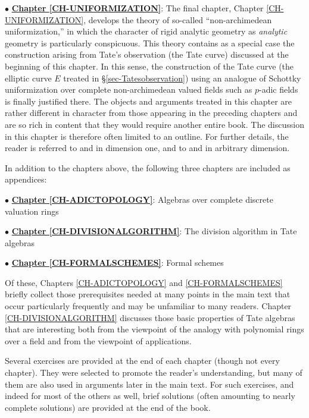 \documentclass[a4paper,12pt, dvipdfmx]{jsbook}
\theoremstyle{plain}
\theoremstyle{definition}
\begin{document}
\medskip
$\bullet$ \underline{{\bf Chapter \ref{CH-UNIFORMIZATION}}}: The final chapter, Chapter \ref{CH-UNIFORMIZATION}, develops the theory of so-called ``non-archimedean uniformization,'' in which the character of rigid analytic geometry as {\it analytic} geometry is particularly conspicuous.
This theory contains as a special case the construction arising from Tate's observation (the Tate curve) discussed at the beginning of this chapter.
In this sense, the construction of the Tate curve (the elliptic curve $E$ treated in \S\ref{sec-Tatesobservation}) using an analogue of Schottky uniformization over complete non-archimedean valued fields such as $p$-adic fields is finally justified there.
The objects and arguments treated in this chapter are rather different in character from those appearing in the preceding chapters and are so rich in content that they would require another entire book. The discussion in this chapter is therefore often limited to an outline.
For further details, the reader is referred to \cite{Mumf1} and \cite{GVP} in dimension one, and to \cite{Kuri} and \cite{Must} in arbitrary dimension.

\medskip
In addition to the chapters above, the following three chapters are included as appendices:

\medskip
$\bullet$ \underline{{\bf Chapter \ref{CH-ADICTOPOLOGY}}}: Algebras over complete discrete valuation rings

$\bullet$ \underline{{\bf Chapter \ref{CH-DIVISIONALGORITHM}}}: The division algorithm in Tate algebras

$\bullet$ \underline{{\bf Chapter \ref{CH-FORMALSCHEMES}}}: Formal schemes

\medskip
Of these, Chapters \ref{CH-ADICTOPOLOGY} and \ref{CH-FORMALSCHEMES} briefly collect those prerequisites needed at many points in the main text that occur particularly frequently and may be unfamiliar to many readers.
Chapter \ref{CH-DIVISIONALGORITHM} discusses those basic properties of Tate algebras that are interesting both from the viewpoint of the analogy with polynomial rings over a field and from the viewpoint of applications.

Several exercises are provided at the end of each chapter (though not every chapter).
They were selected to promote the reader's understanding, but many of them are also used in arguments later in the main text.
For such exercises, and indeed for most of the others as well, brief solutions (often amounting to nearly complete solutions) are provided at the end of the book.
\end{document}
